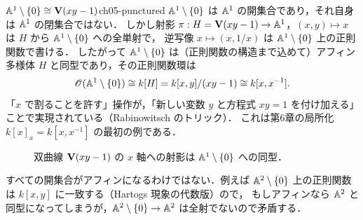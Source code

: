 \begin{myex}{$\mathbb{A}^1\setminus\{0\}\cong \mathbf{V}(xy-1)$}{ch05-punctured}
$\mathbb{A}^1\setminus\{0\}$ は $\mathbb{A}^1$ の開集合であり，それ自身は $\mathbb{A}^1$ の閉集合ではない．
しかし射影 $\pi:H=\mathbf{V}(xy-1)\to\mathbb{A}^1$，$(x,y)\mapsto x$ は $H$ から $\mathbb{A}^1\setminus\{0\}$ への全単射で，
逆写像 $x\mapsto(x,1/x)$ は $\mathbb{A}^1\setminus\{0\}$ 上の正則関数で書ける．
したがって $\mathbb{A}^1\setminus\{0\}$ は（正則関数の構造まで込めて）アフィン多様体 $H$ と同型であり，その正則関数環は
\[
  \mathscr{O}(\mathbb{A}^1\setminus\{0\})\cong k[H]=k[x,y]/(xy-1)\cong k[x,x^{-1}].
\]
「$x$ で割ることを許す」操作が，「新しい変数 $y$ と方程式 $xy=1$ を付け加える」ことで実現されている（Rabinowitsch のトリック）．
これは第6章の局所化 $k[x]_x=k[x,x^{-1}]$ の最初の例である．
\end{myex}

\begin{figure}[H]
\centering
{}
\caption{双曲線 $\mathbf{V}(xy-1)$ の $x$ 軸への射影は $\mathbb{A}^1\setminus\{0\}$ への同型．}
\label{fig:ch05-hyperbola}
\end{figure}

\begin{note}
すべての開集合がアフィンになるわけではない．例えば $\mathbb{A}^2\setminus\{0\}$ 上の正則関数は $k[x,y]$ に一致する（Hartogs 現象の代数版）ので，
もしアフィンなら $\mathbb{A}^2$ と同型になってしまうが，$\mathbb{A}^2\setminus\{0\}\to\mathbb{A}^2$ は全射でないので矛盾する．
\end{note}

